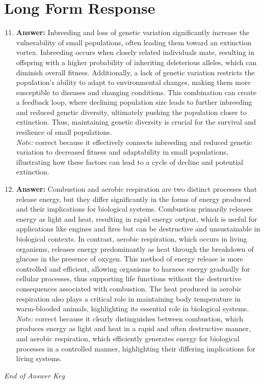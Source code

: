 \documentclass[12pt]{article}
\begin{document}
\section*{Long Form Response}
\begin{enumerate}[label=\arabic*.]
\setcounter{enumi}{10}
\item \textbf{Answer:} Inbreeding and loss of genetic variation significantly increase the vulnerability of small populations, often leading them toward an extinction vortex. Inbreeding occurs when closely related individuals mate, resulting in offspring with a higher probability of inheriting deleterious alleles, which can diminish overall fitness. Additionally, a lack of genetic variation restricts the population's ability to adapt to environmental changes, making them more susceptible to diseases and changing conditions. This combination can create a feedback loop, where declining population size leads to further inbreeding and reduced genetic diversity, ultimately pushing the population closer to extinction. Thus, maintaining genetic diversity is crucial for the survival and resilience of small populations.
\\ \textit{Note:} correct because it effectively connects inbreeding and reduced genetic variation to decreased fitness and adaptability in small populations, illustrating how these factors can lead to a cycle of decline and potential extinction.
\item \textbf{Answer:} Combustion and aerobic respiration are two distinct processes that release energy, but they differ significantly in the forms of energy produced and their implications for biological systems. Combustion primarily releases energy as light and heat, resulting in rapid energy output, which is useful for applications like engines and fires but can be destructive and unsustainable in biological contexts. In contrast, aerobic respiration, which occurs in living organisms, releases energy predominantly as heat through the breakdown of glucose in the presence of oxygen. This method of energy release is more controlled and efficient, allowing organisms to harness energy gradually for cellular processes, thus supporting life functions without the destructive consequences associated with combustion. The heat produced in aerobic respiration also plays a critical role in maintaining body temperature in warm-blooded animals, highlighting its essential role in biological systems.
\\ \textit{Note:} correct because it clearly distinguishes between combustion, which produces energy as light and heat in a rapid and often destructive manner, and aerobic respiration, which efficiently generates energy for biological processes in a controlled manner, highlighting their differing implications for living systems.
\end{enumerate}

\vfill
\noindent\textit{End of Answer Key}
\end{document}
